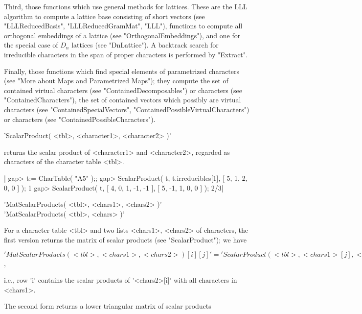 Third, those functions which use general methods for lattices.  These are
the LLL algorithm  to compute a lattice  base consisting of short vectors
(see "LLLReducedBasis", "LLLReducedGramMat", "LLL"), functions to compute
all orthogonal embeddings of a  lattice (see "OrthogonalEmbeddings"), and
one for  the   special case   of $D_n$ lattices     (see "DnLattice").  A
backtrack search  for   irreducible  characters in  the  span  of  proper
characters is performed by "Extract".

Finally, those functions   which  find special elements  of  parametrized
characters (see "More about  Maps and  Parametrized Maps"); they  compute
the set of contained virtual characters (see "ContainedDecomposables") or
characters (see   "ContainedCharacters"),  the set of  contained  vectors
which   possibly are  virtual  characters (see "ContainedSpecialVectors",
"ContainedPossibleVirtualCharacters")      or     characters         (see
"ContainedPossibleCharacters").

%

'ScalarProduct( <tbl>, <character1>, <character2> )'

returns the scalar product  of <character1> and <character2>, regarded as
characters of the character table <tbl>.

|    gap> t:= CharTable( "A5" );;
    gap> ScalarProduct( t, t.irreducibles[1], [ 5, 1, 2, 0, 0 ] );
    1
    gap> ScalarProduct( t, [ 4, 0, 1, -1, -1 ], [ 5, -1, 1, 0, 0 ] );
    2/3|

%

'MatScalarProducts( <tbl>, <chars1>, <chars2> )'\\
'MatScalarProducts( <tbl>, <chars> )'

For   a character   table <tbl>   and   two lists  <chars1>, <chars2>  of
characters, the first version returns the matrix  of scalar products (see
"ScalarProduct"); we have

$'MatScalarProducts( <tbl>, <chars1>, <chars2> )[i][j]' =
 'ScalarProduct( <tbl>, <chars1>[j], <chars2>[i] )'$,

i.e., row  'i' contains the  scalar  products of  '<chars2>[i]' with  all
characters in <chars1>.

The second form returns a lower triangular matrix of scalar products\:

